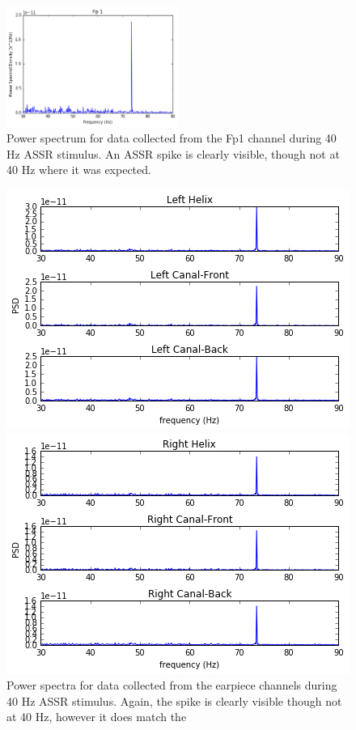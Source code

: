 \documentclass[11pt]{article}
\begin{document}
\begin{figure}[h]
\centering
\includegraphics[width=0.5\textwidth]{001_ASSR_Fp1.jpg}
\caption{Power spectrum for data collected from the Fp1 channel during 40 Hz ASSR stimulus. An ASSR spike is clearly visible, though not at 40 Hz where it was expected.}
\end{figure}

\begin{figure}[h]
  \centering
  \begin{minipage}[b]{0.45\textwidth}
    \includegraphics[width=\textwidth]{001_ASSR_Left.jpg}
  \end{minipage}
  \hfill
  \begin{minipage}[b]{0.45\textwidth}
    \includegraphics[width=\textwidth]{001_ASSR_Right.jpg}
  \end{minipage}
\caption{Power spectra for data collected from the earpiece channels during 40 Hz ASSR stimulus. Again, the spike is clearly visible though not at 40 Hz, however it 
does match the }
\end{figure}
\end{document}
